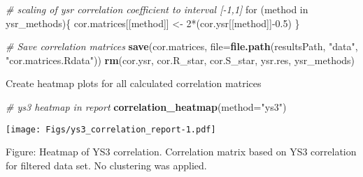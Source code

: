 \documentclass[]{article}
\newenvironment{Shaded}{\begin{snugshade}}{\end{snugshade}}
\newcommand{\KeywordTok}[1]{\textcolor[rgb]{0.13,0.29,0.53}{\textbf{{#1}}}}
\newcommand{\DataTypeTok}[1]{\textcolor[rgb]{0.13,0.29,0.53}{{#1}}}
\newcommand{\DecValTok}[1]{\textcolor[rgb]{0.00,0.00,0.81}{{#1}}}
\newcommand{\FloatTok}[1]{\textcolor[rgb]{0.00,0.00,0.81}{{#1}}}
\newcommand{\StringTok}[1]{\textcolor[rgb]{0.31,0.60,0.02}{{#1}}}
\newcommand{\CommentTok}[1]{\textcolor[rgb]{0.56,0.35,0.01}{\textit{{#1}}}}
\newcommand{\NormalTok}[1]{{#1}}
\begin{document}
\begin{Shaded}
\begin{Highlighting}[]
\CommentTok{# scaling of ysr correlation coefficient to interval [-1,1]}
\NormalTok{for (method in ysr_methods)\{}
  \NormalTok{cor.matrices[[method]] <-}\StringTok{ }\DecValTok{2}\NormalTok{*(cor.ysr[[method]]-}\FloatTok{0.5}\NormalTok{)}
\NormalTok{\}}

\CommentTok{# Save correlation matrices}
\KeywordTok{save}\NormalTok{(cor.matrices, }\DataTypeTok{file=}\KeywordTok{file.path}\NormalTok{(resultsPath, }\StringTok{"data"}\NormalTok{, }\StringTok{"cor.matrices.Rdata"}\NormalTok{))}
\KeywordTok{rm}\NormalTok{(cor.ysr, cor.R_star, cor.S_star, ysr.res, ysr_methods)}
\end{Highlighting}
\end{Shaded}

Create heatmap plots for all calculated correlation matrices

\begin{Shaded}
\end{Shaded}

\begin{Shaded}
\begin{Highlighting}[]
\CommentTok{# ys3 heatmap in report}
\KeywordTok{correlation_heatmap}\NormalTok{(}\DataTypeTok{method=}\StringTok{"ys3"}\NormalTok{)}
\end{Highlighting}
\end{Shaded}

\texttt{[image: Figs/ys3\_correlation\_report-1.pdf]}

Figure: Heatmap of YS3 correlation. Correlation matrix based on YS3
correlation for filtered data set. No clustering was applied.
\end{document}
